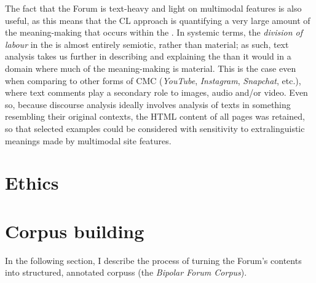 The fact that the \gls{Forum} is text\hyp{}heavy and light on multimodal features is also useful, as this means that the \gls{CL} approach is quantifying a very large amount of the meaning\hyp{}making that occurs within the . In systemic terms, the \emph{division of labour} in the  is almost entirely semiotic, rather than material; as such, text analysis takes us further in describing and explaining the  than it would in a domain where much of the meaning\hyp{}making is material. This is the case even when comparing to other forms of \gls{CMC} (\emph{YouTube}, \emph{Instagram}, \emph{Snapchat}, etc.), where text comments play a secondary role to images, audio and\slash or video. Even so, because discourse analysis ideally involves analysis of texts in something resembling their original contexts, the \gls{HTML} content of all pages was retained, so that selected examples could be considered with sensitivity to extralinguistic meanings made by multimodal site features.


\section{Ethics}



\section{Corpus building}

In the following section, I describe the process of turning the \gls{Forum}'s contents into structured, annotated \glspl{corpus} (the \emph{Bipolar Forum Corpus}).

